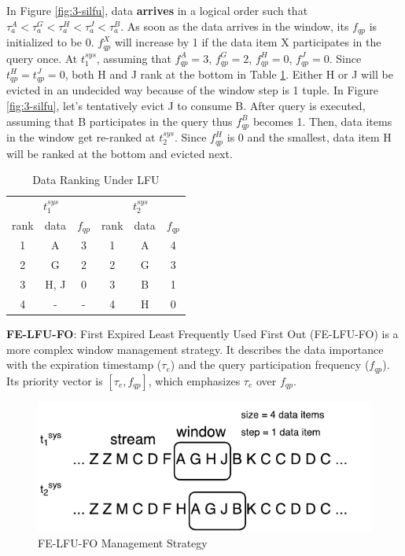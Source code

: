 In Figure \ref{fig:3-silfu}, data \textbf{arrives} in a logical order such that $\tau^{A}_{a} < \tau^{G}_{a} < \tau^{H}_{a} < \tau^{J}_{a} < \tau^{B}_{a}$. 
As soon as the data arrives in the window, its $f_{qp}$ is initialized to be 0.
$f^{X}_{qp}$ will increase by 1 if the data item X participates in the query once.
At $t^{sys}_{1}$, assuming that $f^{A}_{qp} = 3$, $f^{G}_{qp} = 2$, $f^{H}_{qp} = 0$, $f^{J}_{qp} = 0$. 
Since $t^{H}_{qp} = t^{J}_{qp} = 0$, both H and J rank at the bottom in Table \ref{tab:lfu}. 
Either H or J will be evicted in an undecided way because of the window step is 1 tuple. 
In Figure \ref{fig:3-silfu}, let's tentatively evict J to consume B. 
After query is executed, assuming that B participates in the query thus $f^{B}_{qp}$ becomes 1.
Then, data items in the window get re-ranked at $t^{sys}_{2}$.
Since $f^{H}_{qp}$ is 0 and the smallest, data item H will be ranked at the bottom and evicted next. 

\begin{table}[!htbp]
\centering
\caption{Data Ranking Under LFU}
\label{tab:lfu}
\begin{tabular}{|c|c|c||c|c|c|}
\hline
\multicolumn{3}{|c||}{$t^{sys}_{1}$} & \multicolumn{3}{c|}{$t^{sys}_{2}$} \\ \hhline{|======|}
rank & data & $f_{qp}$ & rank & data & $f_{qp}$ \\ \hhline{|=|=|=#=|=|=|}
1 & A & 3 & 1 & A & 4 \\ \hline
2 & G & 2 & 2 & G & 3 \\ \hline
3 & H, J & 0 & 3 & B & 1 \\ \hline
4 & - & - & 4 & H & 0 \\ \hline
\end{tabular}
\end{table}

\textbf{FE-LFU-FO}:
First Expired Least Frequently Used First Out (FE-LFU-FO) is a more complex window management strategy. 
It describes the data importance with the expiration timestamp ($\tau_{e}$) and the query participation frequency ($f_{qp}$).
Its priority vector is $[\tau_{e}, f_{qp}]$, which emphasizes $\tau_{e}$ over $f_{qp}$. 

\begin{figure}[!htbp]
	\centering
    \includegraphics[width=5in]{img/3-sifelfufo.pdf}
    \caption{FE-LFU-FO Management Strategy}
    \label{fig:3-sifelfufo}
\end{figure}

